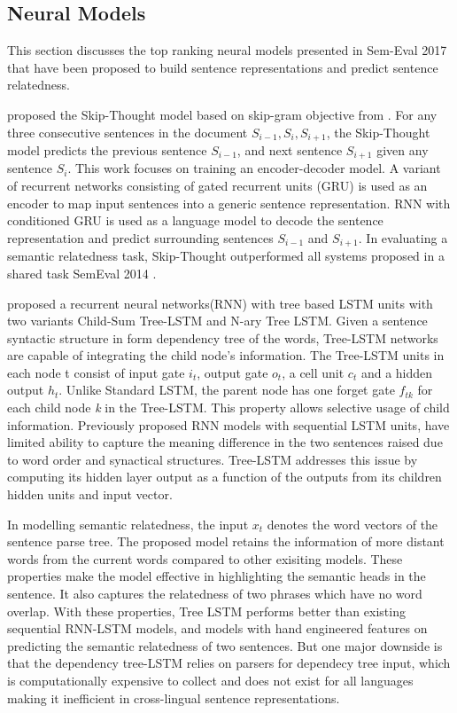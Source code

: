 \documentclass[12pt]{report} %
\begin{document}
\subsection{Neural Models} 

This section discusses the top ranking neural models presented in Sem-Eval 2017 that have been proposed to build sentence representations and predict sentence relatedness.

\cite{kiros2015skip} proposed the Skip-Thought model based on skip-gram objective from \cite{mikolov2014word2vec}. For any three consecutive sentences in the document $S_{i-1}, S_{i}, S_{i+1}$, the Skip-Thought model predicts the previous sentence $S_{i-1}$, and next sentence $S_{i+1}$ given any sentence $S_{i}$.
This work focuses on training an encoder-decoder model. A variant of recurrent networks consisting of gated recurrent units (GRU) \citep{cho2014learning} is used as an encoder to map input sentences into a generic sentence representation. RNN with conditioned GRU is used as a language model to decode the sentence representation and predict surrounding sentences $S_{i-1}$ and $S_{i+1}$. In evaluating a semantic relatedness task, Skip-Thought outperformed all systems proposed in a shared task SemEval 2014 \citep{marelli2014semeval}.

\cite{tai2015improved} proposed a recurrent neural networks(RNN) with tree based LSTM units with two variants Child-Sum Tree-LSTM and N-ary Tree LSTM. Given a sentence syntactic structure in form dependency tree of the words, Tree-LSTM networks are capable of integrating the child node's information. The Tree-LSTM units in each node t consist of input gate $i_{t}$, output gate $o_{t}$, a cell unit $c_{t}$ and a hidden output $h_{t}$. Unlike Standard LSTM, the parent node has one forget gate $f_{tk}$ for each child node \textit{k} in the Tree-LSTM. This property allows selective usage of child information. Previously proposed RNN models with sequential LSTM units, have limited ability to capture the meaning difference in the two sentences raised due to word order and synactical structures. Tree-LSTM addresses this issue by computing its hidden layer output as a function of the outputs from its children hidden units and input vector. 

In modelling semantic relatedness, the input $x_{t}$ denotes the word vectors of the sentence parse tree. The proposed model retains the information of more distant words from the current words compared to other exisiting models. These properties make the model effective in highlighting the semantic heads in the sentence. It also captures the relatedness of two phrases which have no word overlap. With these properties, Tree LSTM performs better than existing sequential RNN-LSTM models, and models with hand engineered features on predicting the semantic relatedness of two sentences. But one major downside is that the dependency tree-LSTM relies on parsers for dependecy tree input, which is computationally expensive to collect and does not exist for all languages making it inefficient in cross-lingual sentence representations.
\end{document}
